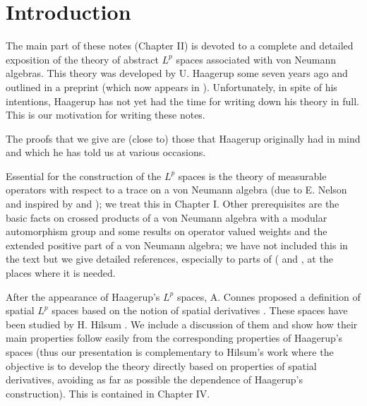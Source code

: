 
% 
\chapter*{Introduction}
The main part of these notes (Chapter II) is devoted to a complete and detailed exposition of the theory of abstract $L^p$ spaces associated with von Neumann algebras. This theory was developed by U. Haagerup some seven years ago and outlined in a preprint (which now appears in \cite{9}). Unfortunately, in spite of his intentions, Haagerup has not yet had the time for writing down his theory in full. This is our motivation for writing these notes.\par
The proofs that we give are (close to) those that Haagerup originally had in mind and which he has told us at various occasions.\par
Essential for the construction of the $L^p$ spaces is the theory of measurable operators with respect to a trace on a von Neumann algebra (due to E. Nelson \cite{13} and inspired by \cite{15} and \cite{16}); we treat this in Chapter I. Other prerequisites are the basic facts on crossed products of a von Neumann algebra with a modular automorphism group and some results on operator valued weights and the extended positive part of a von Neumann algebra; we have not included this in the text but we give detailed references, especially to parts of (\cite{7} and \cite{8}, at the places where it is needed.\par
After the appearance of Haagerup's $L^p$ spaces, A. Connes proposed a definition of spatial $L^p$ spaces based on the notion of spatial derivatives \cite{1}. These spaces have been studied by H. Hilsum \cite{10}. We include a discussion of them and show how their main properties follow easily from the corresponding properties of Haagerup's spaces (thus our presentation is complementary to Hilsum's work \cite{10} where the objective is to develop the theory directly based on properties of spatial derivatives, avoiding as far as possible the dependence of Haagerup's construction). This is contained in Chapter IV.\par
